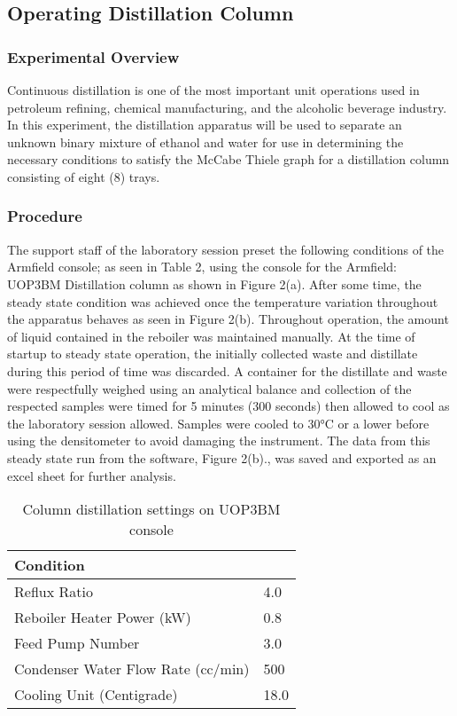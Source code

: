\documentclass[peerreview, a4paper, 12pt]{IEEEtran}
\begin{document}
\subsection{\textbf{Operating Distillation Column}}
\subsubsection[]{\textbf{Experimental Overview}}
Continuous distillation is one of the most important unit operations used in petroleum refining, chemical manufacturing, and the alcoholic beverage industry. In this experiment, the distillation apparatus will be used to separate an unknown binary mixture of ethanol and water for use in determining the necessary conditions to satisfy the McCabe Thiele graph for a distillation column consisting of eight (8) trays. 
\subsubsection[]{\textbf{Procedure}}
The support staff of the laboratory session preset the following conditions of the Armfield console; as seen in Table 2, using the console for the Armfield: UOP3BM Distillation column as shown in Figure 2(a). After some time, the steady state condition was achieved once the temperature variation throughout the apparatus behaves as seen in Figure 2(b). Throughout operation, the amount of liquid contained in the reboiler was maintained manually. At the time of startup to steady state operation, the initially collected waste and distillate during this period of time was discarded. A container for the distillate and waste were respectfully weighed using an analytical balance and collection of the respected samples were timed for 5 minutes (300 seconds) then allowed to cool as the laboratory session allowed. Samples were cooled to 30°C or a lower before using the densitometer to avoid damaging the instrument. The data from this steady state run from the software, Figure 2(b)., was saved and exported as an excel sheet for further analysis.

\begin{center}
    \begin{table}
    \centering            
    \caption{Column distillation settings on UOP3BM console}
    {\tabulinesep =1.2mm
    \begin{tabu} {|p{2in}|p{0.5in}|}
    \hline
    Condition & \\
    \hline
    Reflux Ratio & 4.0 \\
    \hline
    Reboiler Heater Power (kW) & 0.8\\
    \hline
    Feed Pump Number & 3.0\\
    \hline
    Condenser Water Flow Rate (cc/min) & 500\\
    \hline
    Cooling Unit (Centigrade) & 18.0\\
    \hline
    \end{tabu}}
    \end{table}
\end{center}
\end{document}
